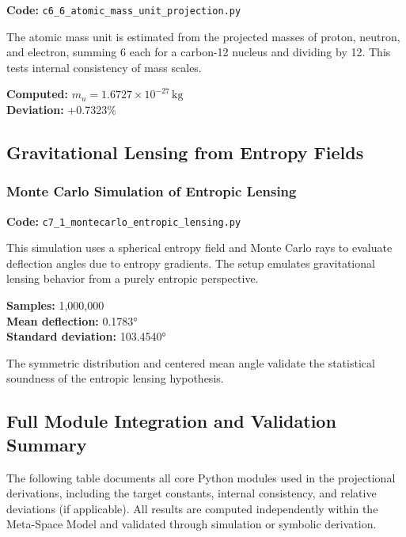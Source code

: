 \documentclass[10.5pt,a4paper]{article}
\begin{document}
\textbf{Code:} \texttt{c6\_6\_atomic\_mass\_unit\_projection.py}

The atomic mass unit is estimated from the projected masses of proton, neutron, and electron, summing 6 each for a carbon-12 nucleus and dividing by 12. This tests internal consistency of mass scales.

\textbf{Computed:} \(m_u = 1.6727 \times 10^{-27}\,\mathrm{kg}\) \\
\textbf{Deviation:} +0.7323\%

\subsection{Gravitational Lensing from Entropy Fields}

\subsubsection{Monte Carlo Simulation of Entropic Lensing}

\textbf{Code:} \texttt{c7\_1\_montecarlo\_entropic\_lensing.py}

This simulation uses a spherical entropy field and Monte Carlo rays to evaluate deflection angles due to entropy gradients. 
The setup emulates gravitational lensing behavior from a purely entropic perspective.

\textbf{Samples:} 1,000,000\\
\textbf{Mean deflection:} 0.1783°\\
\textbf{Standard deviation:} 103.4540°

The symmetric distribution and centered mean angle validate the statistical soundness of the entropic lensing hypothesis.

\clearpage

\subsection{Full Module Integration and Validation Summary}

The following table documents all core Python modules used in the projectional derivations, including the target constants, internal consistency, and relative deviations (if applicable). 
All results are computed independently within the Meta-Space Model and validated through simulation or symbolic derivation.

\renewcommand{\arraystretch}{1.8}
\end{document}
